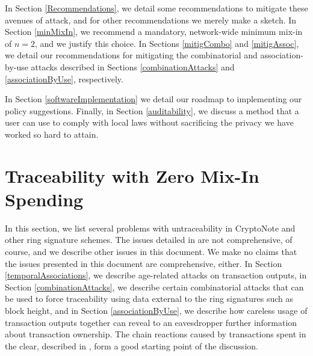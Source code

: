 \documentclass[12pt,english]{mrl}
\theoremstyle{definition}
\numberwithin{equation}{section}
\numberwithin{figure}{section}
\numberwithin{equation}{section}
\numberwithin{equation}{section}
\numberwithin{figure}{section}
\begin{document}
In Section \ref{Recommendations}, we detail some recommendations to mitigate these avenues of attack, and for other recommendations we merely make a sketch. In Section \ref{minMixIn}, we recommend a  mandatory, network-wide minimum mix-in of $n=2$, and we justify this choice.  In Sections \ref{mitigCombo} and \ref{mitigAssoc}, we detail our recommendations for mitigating the combinatorial and association-by-use attacks described in Sections \ref{combinationAttacks} and \ref{associationByUse}, respectively. 

In Section \ref{softwareImplementation} we detail our roadmap to implementing our policy suggestions. Finally, in Section \ref{auditability}, we discuss a method that a user can use to comply with local laws without sacrificing the privacy we have worked so hard to attain.

\section{Traceability with Zero Mix-In Spending}\label{chainRxns}

In this section, we list several problems with untraceability in CryptoNote and other ring signature schemes. The issues detailed in \cite{chainReactions} are not comprehensive, of course, and we describe other issues in this document. We make no claims that the issues presented in this document are comprehensive, either. In Section \ref{temporalAssociations}, we describe age-related attacks on transaction outputs, in Section \ref{combinationAttacks}, we describe certain combinatorial attacks that can be used to force traceability using data external to the ring signatures such as block height, and in Section \ref{associationByUse}, we describe how careless usage of transaction outputs together can reveal to an eavesdropper further information about transaction ownership. The chain reactions caused by transactions spent in the clear, described in \cite{chainReactions}, form a good starting point of the discussion.
\end{document}
